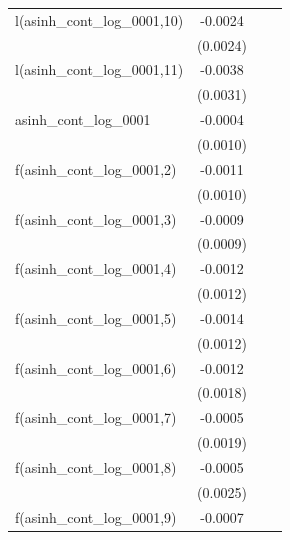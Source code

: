\begin{tabular}{lccc}
   l(asinh\_cont\_log\_0001,10)           & -0.0024  &                       &   \\   
                                          & (0.0024) &                       &   \\   
   l(asinh\_cont\_log\_0001,11)           & -0.0038  &                       &   \\   
                                          & (0.0031) &                       &   \\   
   asinh\_cont\_log\_0001                 & -0.0004  &                       &   \\   
                                          & (0.0010) &                       &   \\   
   f(asinh\_cont\_log\_0001,2)            & -0.0011  &                       &   \\   
                                          & (0.0010) &                       &   \\   
   f(asinh\_cont\_log\_0001,3)            & -0.0009  &                       &   \\   
                                          & (0.0009) &                       &   \\   
   f(asinh\_cont\_log\_0001,4)            & -0.0012  &                       &   \\   
                                          & (0.0012) &                       &   \\   
   f(asinh\_cont\_log\_0001,5)            & -0.0014  &                       &   \\   
                                          & (0.0012) &                       &   \\   
   f(asinh\_cont\_log\_0001,6)            & -0.0012  &                       &   \\   
                                          & (0.0018) &                       &   \\   
   f(asinh\_cont\_log\_0001,7)            & -0.0005  &                       &   \\   
                                          & (0.0019) &                       &   \\   
   f(asinh\_cont\_log\_0001,8)            & -0.0005  &                       &   \\   
                                          & (0.0025) &                       &   \\   
   f(asinh\_cont\_log\_0001,9)            & -0.0007  &                       &   \\   

\end{tabular}
